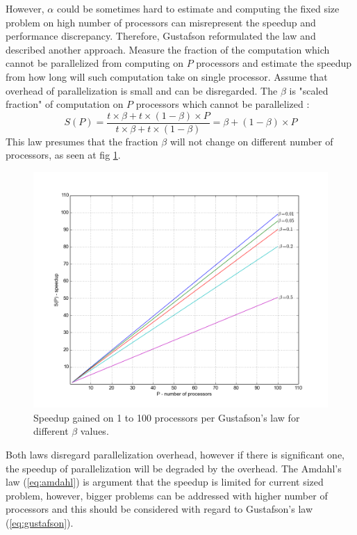However, $\alpha$ could be sometimes hard to estimate and computing the fixed size problem on high number of processors can misrepresent the speedup and performance discrepancy. Therefore, Gustafson reformulated the law and described another approach. Measure the fraction of the computation which cannot be parallelized from computing on $P$ processors and estimate the speedup from how long will such computation take on single processor. Assume that overhead of parallelization is small and can be disregarded. The $\beta$ is "scaled fraction" of computation on $P$ processors which cannot be parallelized \cite{Gustafson1988}:
\begin{equation} \label{eq:gustafson}
S(P) = \frac{t \times \beta + t\times(1-\beta)\times P}{t\times\beta+t\times(1-\beta)} = \beta + (1-\beta)\times P 
\end{equation}
This law presumes that the fraction $\beta$ will not change on different number of processors, as seen at fig \ref{fig:gustafson}.
\begin{figure}[ht]
    \centering
    \includegraphics[width=1\textwidth]{chapter2/Gustafson.png}
    \caption{Speedup gained on 1 to 100 processors per Gustafson's law for different $\beta$ values.}
    \label{fig:gustafson}
\end{figure}

Both laws disregard parallelization overhead, however if there is significant one, the speedup of parallelization will be degraded by the overhead. The Amdahl's law (\ref{eq:amdahl}) is argument that the speedup is limited for current sized problem, however, bigger problems can be addressed with higher number of processors and this should be considered with regard to Gustafson's law (\ref{eq:gustafson}).

